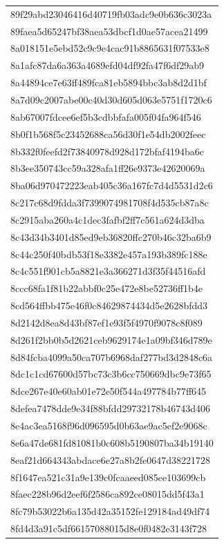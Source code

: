 \begin{tabular}{l}
89f29abd23046416d40719fb03adc9e0b636c3023a \\
89faea5d65247bf38aea53dbcf1d0ae57acea21499 \\
8a018151e5ebd52c9c9e4cac91b8865631f07533e8 \\
8a1afc87da6a363a4689efd04df92fa47f6df29ab9 \\
8a44894ce7e63ff489fca81eb5894bbc3ab8d2d1bf \\
8a7d09c2007abe00c40d30d605d063e5751f1720c6 \\
8ab67007fdcee6ef5b3cdbbfafa005f04fa964f546 \\
8b0f1b568f5c23452688ca56d30f1e54db2002feec \\
8b332f0feefd2f73840978d928d172bfaf4194ba6c \\
8b3ee350743cc59a328afa1ff26e9373e42620069a \\
8ba06d970472223eab405c36a167fc7d4d5531d2c6 \\
8c217c68d9fdda3f7399074981708f4d535cb87a8c \\
8c2915aba260a4c1dec3fafbf2ff7c561a624d3dba \\
8c43d34b3401d85ed9eb36820ffc270b46c32ba6b9 \\
8c44c250f40bdb53f18e3382e457a193b389fc188e \\
8c4c551f901cb5a8821e3a366271d3f35f44516afd \\
8ccc68fa1f81b22abbf0c25e472e8be52736ff1b4e \\
8cd564ffbb475e46f0c84629874434d5e2628bfdd3 \\
8d2142d8ea8d43bf87ef1e93f5f4970f9078c8f089 \\
8d261f2bb0b5d2621ceb9629174e1a09bf346d789e \\
8d84fcba4099a50ca707b6968daf277bd3d2848c6a \\
8dc1c1cd67600d57bc73c3b6cc750669dbc9e73f65 \\
8dce267e40e60ab01e72e50f544a497784b77ff645 \\
8defea7478dde9e34f88bfdd29732178b46743d406 \\
8e4ac3ea5168f96d096595d0b63ae9ac5ef2e9068c \\
8e6a47de681fd81081b0c608b5190807ba34b19140 \\
8eaf21d664343abdace6e27a8b2fe0647d38221728 \\
8f1647ea521c31a9e139c0fcaaeed085ee103699cb \\
8faec228b96d2eef6f2586ca892ce08015dd5f43a1 \\
8fc79b53022b6a135d42a35152fe129184ad49df74 \\
8fd4d3a91c5df66157088015d8e0f0482e3143f728 \\

\end{tabular}
